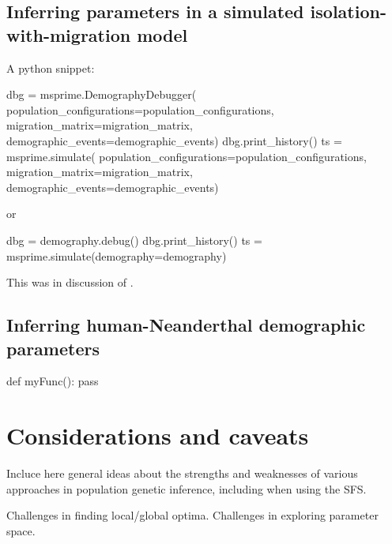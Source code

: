 \documentclass[]{article}
\begin{document}
\subsection{Inferring parameters in a simulated isolation-with-migration model}

A python snippet:
\begin{python}
dbg = msprime.DemographyDebugger(
  population_configurations=population_configurations,
  migration_matrix=migration_matrix,
  demographic_events=demographic_events)
dbg.print_history()
ts = msprime.simulate(
  population_configurations=population_configurations,
  migration_matrix=migration_matrix,
  demographic_events=demographic_events)
\end{python}
or
\begin{python}
dbg = demography.debug()
dbg.print_history()
ts = msprime.simulate(demography=demography)
\end{python}

This was in discussion of \citet{kelleher2016efficient}.

\subsection{Inferring human-Neanderthal demographic parameters}

\begin{python}
def myFunc():
    pass
\end{python}

\section{Considerations and caveats}

Incluce here general ideas about the strengths and weaknesses of various approaches
in population genetic inference, including when using the SFS.

Challenges in finding local/global optima. Challenges in exploring parameter space.





\clearpage

\appendix
\renewcommand{\thesection}{A\arabic{section}}
\renewcommand{\theequation}{A\arabic{equation}}
\renewcommand{\thefigure}{A\arabic{figure}}
\renewcommand{\thetable}{A\arabic{table}}
\setcounter{figure}{0}
\setcounter{equation}{0}
\setcounter{table}{0}

\end{document}
